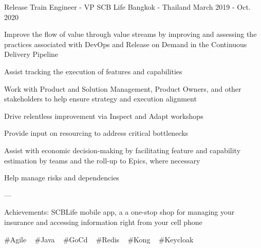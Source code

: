 \begin{cventries}
  \cventry
    {Release Train Engineer - VP} %
    {SCB Life} %
    {Bangkok - Thailand} %
    {March 2019 - Oct. 2020} %
    {
      \begin{cvitems} %
        \item {Improve the flow of value through value streams by improving and assessing the practices associated with DevOps and Release on Demand in the Continuous Delivery Pipeline}
        \item {Assist tracking the execution of features and capabilities}
        \item {Work with Product and Solution Management, Product Owners, and other stakeholders to help ensure strategy and execution alignment}
        \item {Drive relentless improvement via Inspect and Adapt workshops}
        \item {Provide input on resourcing to address critical bottlenecks}
        \item {Assist with economic decision-making by facilitating feature and capability estimation by teams and the roll-up to Epics, where necessary}
        \item {Help manage risks and dependencies}
        \item {---}
        \item {Achievements: SCBLife mobile app, a a one-stop shop for managing your insurance and accessing information right from your cell phone}
      \end{cvitems}
    }
    {
      \#Agile ~
      \#Java ~
      \#GoCd ~
      \#Redis ~
      \#Kong ~
      \#Keycloak ~
    }


\end{cventries}
